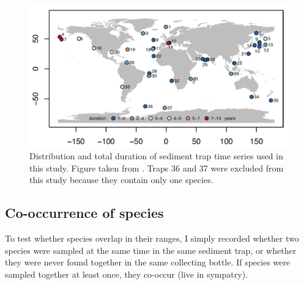 \begin{figure}
\centering
\includegraphics[width=1\textwidth]{traps_map.png}
\caption{\label{fig:map} Distribution and total duration of sediment trap time series used in this study. Figure taken from \citep{jonkers2015global}. Traps 36 and 37 were excluded from this study because they contain only one species.}
\end{figure}

\begin{table}
\footnotesize
\caption{\label{table:traps_data} Meta-data of sediment traps taken from \citep{jonkers2015global}. Columns: \textbf{Trap number} as in Figure \ref{fig:map}; \textbf{Trap name}; Coordinates (\textbf{Lat, Lon}); \textbf{resolution}: mean period (in days) that each sample (bottle) in the trap was open; \textbf{length days}: total period trap was open (in days); \textbf{length years}: total period in years; \textbf{length series}: total number of samples collected in each trap (length of the time-series); \textbf{from, to}: year interval when trap was active; \textbf{all ssp}: whether all species were identified in each trap, "NO" means that just dominant species were picked.}
\makebox[\linewidth]{ %

}
\end{table}


\subsection{Co-occurrence of species}

To test whether species overlap in their ranges, I simply recorded whether two species were sampled at the same time in the same sediment trap, or whether they were never found together in the same collecting bottle. If species were sampled together at least once, they co-occur (live in sympatry). 


